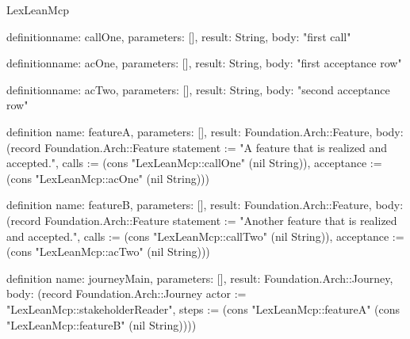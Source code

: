 \begin{lexlean}{LexLeanMcp}
\begin{semanticmodule}
definition{name: callOne, parameters: [], result: String, body: "first call"}

definition{name: acOne, parameters: [], result: String, body: "first acceptance row"}

definition{name: acTwo, parameters: [], result: String, body: "second acceptance row"}

definition{
  name: featureA,
  parameters: [],
  result: Foundation.Arch::Feature,
  body: (record Foundation.Arch::Feature {statement := "A feature that is realized and accepted.", calls := (cons "LexLeanMcp::callOne" (nil String)), acceptance := (cons "LexLeanMcp::acOne" (nil String))})
}

definition{
  name: featureB,
  parameters: [],
  result: Foundation.Arch::Feature,
  body: (record Foundation.Arch::Feature {statement := "Another feature that is realized and accepted.", calls := (cons "LexLeanMcp::callTwo" (nil String)), acceptance := (cons "LexLeanMcp::acTwo" (nil String))})
}

definition{
  name: journeyMain,
  parameters: [],
  result: Foundation.Arch::Journey,
  body: (record Foundation.Arch::Journey {actor := "LexLeanMcp::stakeholderReader", steps := (cons "LexLeanMcp::featureA" (cons "LexLeanMcp::featureB" (nil String)))})
}
\end{semanticmodule}
\end{lexlean}
